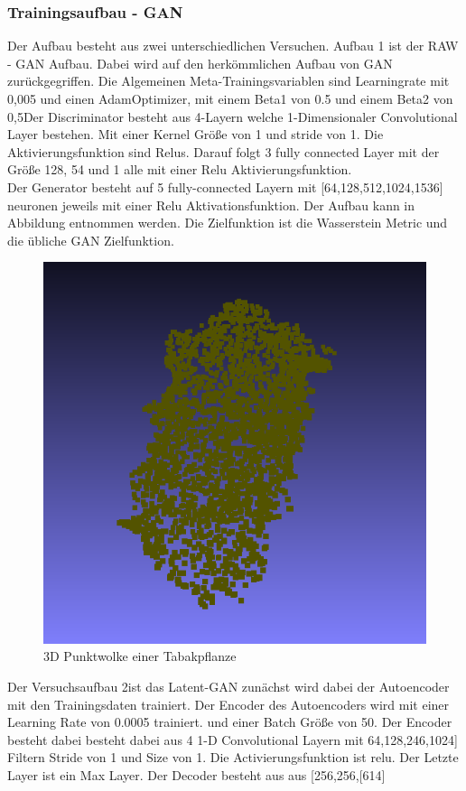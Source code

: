 \documentclass{llncs}
\begin{document}
\subsubsection{Trainingsaufbau - GAN}
Der Aufbau besteht aus zwei unterschiedlichen Versuchen. Aufbau 1 ist der RAW - GAN Aufbau. Dabei wird auf den herkömmlichen Aufbau von GAN zurückgegriffen. Die Algemeinen Meta-Trainingsvariablen sind Learningrate mit 0,005 und einen AdamOptimizer, mit einem Beta1 von 0.5 und einem Beta2 von 0,5Der Discriminator besteht aus 4-Layern welche 1-Dimensionaler Convolutional Layer bestehen. Mit einer Kernel Größe von 1 und stride von 1. Die Aktivierungsfunktion sind Relus. Darauf folgt 3 fully connected Layer mit der Größe 128, 54 und 1 alle mit einer Relu Aktivierungsfunktion.
\\
Der Generator besteht auf 5 fully-connected Layern mit [64,128,512,1024,1536] neuronen jeweils mit einer Relu Aktivationsfunktion. Der Aufbau kann in Abbildung entnommen werden. Die Zielfunktion ist die Wasserstein Metric und die übliche GAN Zielfunktion. 
\begin{figure}[htbp] 
	\centering
	\includegraphics[width=1.2\textwidth]{leaf1.png}
	\caption{3D Punktwolke einer Tabakpflanze}
	\label{fig:Bild2}
\end{figure}

Der Versuchsaufbau 2ist das Latent-GAN zunächst wird dabei der Autoencoder mit den Trainingsdaten trainiert. Der Encoder des Autoencoders wird mit einer Learning Rate von 0.0005 trainiert. und einer Batch Größe von 50. Der Encoder besteht dabei besteht dabei aus 4 1-D Convolutional Layern mit 64,128,246,1024] Filtern Stride von 1 und Size von 1. Die Activierungsfunktion ist relu. Der Letzte Layer ist ein Max Layer. Der Decoder besteht aus aus [256,256,[614]
\end{document}
